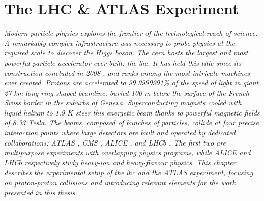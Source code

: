 \chapter{\color{oxfordblue} The LHC \& ATLAS Experiment}\label{chapter-ATLAS}
\ChapFrame

\textit{
Modern particle physics explores the frontier of the technological reach of science. A remarkably complex infrastructure was necessary to probe physics at the required scale to discover the Higgs boson. The \gls{cern} hosts the largest and most powerful particle accelerator ever built: the \gls{lhc}. It has held this title since its construction concluded in 2008 \cite{LyndonEvans_2008}, and ranks among the most intricate machines ever created. Protons are accelerated to 99.9999991\% of the speed of light in giant 27 km-long ring-shaped beamline, buried 100 m below the surface of the French-Swiss border in the suburbs of Geneva. Superconducting magnets cooled with liquid helium to 1.9 $K$ steer this energetic beam thanks to powerful magnetic fields of 8.33 Tesla. The beams, composed of bunches of particles, collide at four precise interaction points where large detectors are built and operated by dedicated collaborations: ATLAS \cite{TheATLASCollaboration_2008}, CMS \cite{TheCMSCollaboration_2008}, ALICE \cite{TheALICECollaboration_2008}, and LHC$b$ \cite{TheLHCbCollaboration_2008}. The first two are multipurpose experiments with overlapping physics programs, while ALICE and LHC$b$ respectively study heavy-ion and heavy-flavour physics. This chapter describes the experimental setup of the \gls{lhc} and the ATLAS experiment, focusing on proton-proton collisions and introducing relevant elements for the work presented in this thesis.} 

